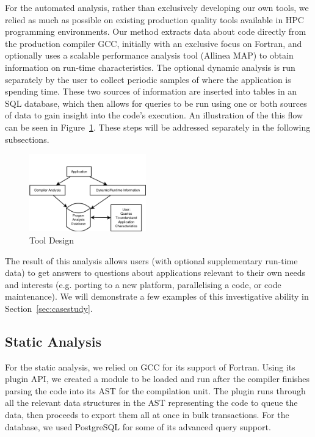 For the automated analysis, rather than exclusively developing our own tools, we relied as much as 
possible on existing production quality tools available in \acs{HPC} programming environments.
Our method extracts data about code directly from the production compiler \acs{GCC}, initially with 
an exclusive focus on Fortran, and optionally uses a scalable performance analysis tool (Allinea 
MAP) to obtain information on run-time characteristics.
The optional dynamic analysis is run separately by the user to collect periodic samples of where the 
application is spending time.
These two sources of information are inserted into tables in an \acs{SQL} database, which then 
allows 
for queries to be run using one or both sources of data to gain insight into the code's execution.
An illustration of the this flow can be seen in Figure~\ref{fig:design}.
These steps will be addressed separately in the following subsections.

\begin{figure}
\begin{center}
\includegraphics[width=0.45\textwidth]{images/design.png}
\end{center}
\caption{Tool Design}
\label{fig:design}
\end{figure}

The result of this analysis allows users (with optional supplementary run-time data) to get answers to 
questions about applications relevant to their own needs and interests (e.g. porting to a new platform, parallelising a code, or code maintenance).
We will demonstrate a few examples of this investigative ability in Section~\ref{sec:casestudy}.

\subsection{Static Analysis}
For the static analysis, we relied on \acs{GCC} for its support of Fortran.
Using its plugin \acs{API}, we created a module to be loaded and run after the compiler finishes 
parsing the code into its \ac{AST} for the compilation unit.
The plugin runs through all the relevant data structures in the \ac{AST} representing the code to 
queue the data, then proceeds to export them all at once in bulk transactions.
For the database, we used PostgreSQL for some of its advanced query support.
